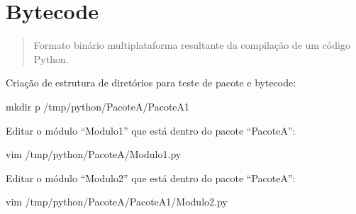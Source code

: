 \documentclass[letterpaper,10pt,brazil]{sphinxmanual}
\begin{document}
\begin{sphinxVerbatim}[commandchars=\\\{\}]
    
\end{sphinxVerbatim}

\begin{sphinxVerbatim}[commandchars=\\\{\}]
\end{sphinxVerbatim}


\section{Bytecode}
\label{\detokenize{content/language_particularities:bytecode}}\begin{quote}

Formato binário multiplataforma resultante da compilação de um código Python.
\end{quote}

Criação de estrutura de diretórios para teste de pacote e bytecode:

\begin{sphinxVerbatim}[commandchars=\\\{\}]
mkdir \PYGZhy{}p /tmp/python/PacoteA/PacoteA1
\end{sphinxVerbatim}

Editar o módulo “Modulo1” que está dentro do pacote “PacoteA”:

\begin{sphinxVerbatim}[commandchars=\\\{\}]
vim /tmp/python/PacoteA/Modulo1.py
\end{sphinxVerbatim}

\begin{sphinxVerbatim}[commandchars=\\\{\},numbers=left,firstnumber=1,stepnumber=1]
 
\end{sphinxVerbatim}

Editar o módulo “Modulo2” que está dentro do pacote “PacoteA”:

\begin{sphinxVerbatim}[commandchars=\\\{\}]
vim /tmp/python/PacoteA/PacoteA1/Modulo2.py
\end{sphinxVerbatim}
\end{document}
